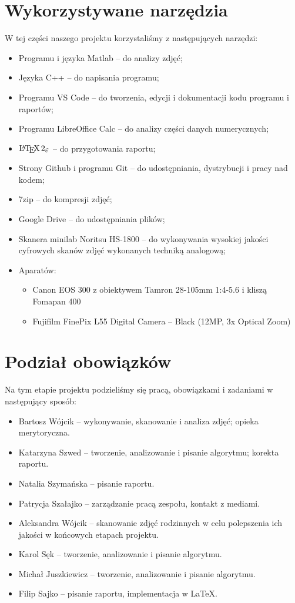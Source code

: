 \documentclass[]{mwart}
\begin{document}
\section{Wykorzystywane narzędzia}
W tej części naszego projektu korzystaliśmy z następujących narzędzi:
\begin{itemize}
    \item Programu i języka Matlab -- do analizy zdjęć;
    \item Języka C++ -- do napisania programu;
    \item Programu VS Code -- do tworzenia, edycji i dokumentacji kodu programu i raportów;
    \item Programu LibreOffice Calc -- do analizy części danych numerycznych;
    \item $\LaTeXe{}$ -- do przygotowania raportu;
    \item Strony Github i programu Git -- do udostępniania, dystrybucji i pracy nad kodem;
    \item 7zip -- do kompresji zdjęć;
    \item Google Drive -- do udostępniania plików;
    \item Skanera minilab Noritsu HS-1800 -- do wykonywania wysokiej jakości cyfrowych skanów zdjęć wykonanych techniką analogową;
    \item Aparatów:
          \begin{itemize}
              \item Canon EOS 300 z obiektywem Tamron 28-105mm 1:4-5.6 i kliszą Fomapan 400
              \item Fujifilm FinePix L55 Digital Camera -- Black (12MP, 3x Optical Zoom)
          \end{itemize}
\end{itemize}


\section{Podział obowiązków}
Na tym etapie projektu podzieliśmy się pracą, obowiązkami i zadaniami w następujący sposób:
\begin{itemize}
    \item Bartosz Wójcik -- wykonywanie, skanowanie i analiza zdjęć; opieka merytoryczna.
    \item Katarzyna Szwed -- tworzenie, analizowanie i pisanie algorytmu; korekta raportu.
    \item Natalia Szymańska -- pisanie raportu.
    \item Patrycja Szałajko -- zarządzanie pracą zespołu, kontakt z mediami.
    \item Aleksandra Wójcik -- skanowanie zdjęć rodzinnych w celu polepszenia ich jakości w końcowych etapach projektu.
    \item Karol Sęk -- tworzenie, analizowanie i pisanie algorytmu.
    \item Michał Juszkiewicz -- tworzenie, analizowanie i pisanie algorytmu.
    \item Filip Sajko -- pisanie raportu, implementacja w \LaTeX{}.
\end{itemize}
\end{document}
